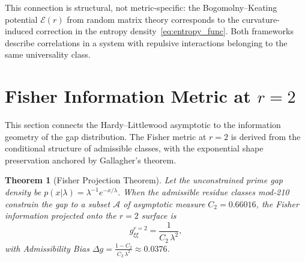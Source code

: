 \documentclass[12pt]{article}
\newtheorem{theorem}{Theorem}[section]
\begin{document}
This connection is structural, not metric-specific: the Bogomolny--Keating
potential $\mathcal{E}(r)$ from random matrix theory corresponds to the
curvature-induced correction in the entropy density~\eqref{eq:entropy_func}.
Both frameworks describe correlations in a system with repulsive interactions
belonging to the same universality class.

\section{Fisher Information Metric at $r=2$}

This section connects the Hardy--Littlewood asymptotic to the information
geometry of the gap distribution. The Fisher metric at $r=2$ is derived from
the conditional structure of admissible classes, with the exponential shape
preservation anchored by Gallagher's theorem.

\begin{theorem}[Fisher Projection Theorem]
Let the unconstrained prime gap density be $p(x|\lambda) = \lambda^{-1} e^{-x/\lambda}$.
When the admissible residue classes mod-210 constrain the gap to a subset
$\mathcal{A}$ of asymptotic measure $C_2 = 0.66016$, the Fisher information
projected onto the $r=2$ surface is
\begin{equation}
  g_{\xi\xi}^{r=2} = \frac{1}{C_2\,\lambda^2},
  \label{eq:fisher_r2}
\end{equation}
with Admissibility Bias $\Delta g = \frac{1 - C_2}{C_2\,\lambda^2} \approx 0.0376$.
\end{theorem}
\label{thm:fisher}
\end{document}
